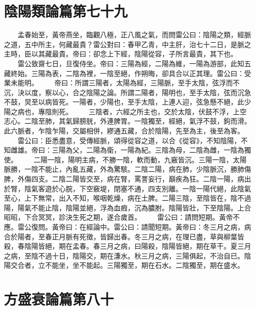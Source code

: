 \section{陰陽類論篇第七十九}

　　孟春始至，黃帝燕坐，臨觀八極，正八風之氣，而問雷公曰：陰陽之類，經脈之道，五中所主，何藏最貴？雷公對曰：春甲乙青，中主肝，治七十二日，是脈之主時，臣以其藏最貴。帝曰：卻念上下經，陰陽從容，子所言最貴，其下也。
　　雷公致齋七日，旦復侍坐。帝曰：三陽為經，二陽為維，一陽為游部，此知五藏終始。三陽為表，二陰為裡，一陰至絕，作朔晦，卻具合以正其理。雷公曰：受業未能明。
　　帝曰：所謂三陽者，太陽為經，三陽脈，至手太陰，弦浮而不沉，決以度，察以心，合之陰陽之論。所謂二陽者，陽明也，至手太陰，弦而沉急不鼓，炅至以病皆死。一陽者，少陽也，至手太陰，上連人迎，弦急懸不絕，此少陽之病也，專陰則死。
　　三陰者，六經之所主也，交於太陰，伏鼓不浮，上空志心。二陰至肺，其氣歸膀胱，外連脾胃。一陰獨至，經絕，氣浮不鼓，鉤而滑。此六脈者，乍陰乍陽，交屬相併，繆通五藏，合於陰陽，先至為主，後至為客。
　　雷公曰：臣悉盡意，受傳經脈，頌得從容之道，以合《從容》，不知陰陽，不知雌雄。帝曰：三陽為父，二陽為衛，一陽為紀。三陰為母，二陰為雌，一陰為獨使。
　　二陽一陰，陽明主病，不勝一陰，軟而動，九竅皆沉。三陽一陰，太陽脈勝，一陰不能止，內亂五藏，外為驚駭。二陰二陽，病在肺，少陰脈沉，勝肺傷脾，外傷四支。二陰二陽皆交至，病在腎，罵詈妄行，巔疾為狂。二陰一陽，病出於腎，陰氣客遊於心脘，下空竅堤，閉塞不通，四支別離。一陰一陽代絕，此陰氣至心，上下無常，出入不知，喉咽乾燥，病在土脾。二陽三陰，至陰皆在，陰不過陽，陽氣不能止陰，陰陽並絕，浮為血瘕，沉為膿胕。陰陽皆壯，下至陰陽。上合昭昭，下合冥冥，診決生死之期，遂合歲首。
　　雷公曰：請問短期。黃帝不應。雷公復問。黃帝曰：在經論中。雷公曰：請聞短期。黃帝曰：冬三月之病，病合於陽者，至春正月脈有死徵，皆歸出春。冬三月之病，在理已盡，草與柳葉皆殺，春陰陽皆絕，期在孟春。春三月之病，曰陽殺，陰陽皆絕，期在草干。夏三月之病，至陰不過十日，陰陽交，期在溓水。秋三月之病，三陽俱起，不治自已。陰陽交合者，立不能坐，坐不能起。三陽獨至，期在石水。二陰獨至，期在盛水。

\section{方盛衰論篇第八十}

